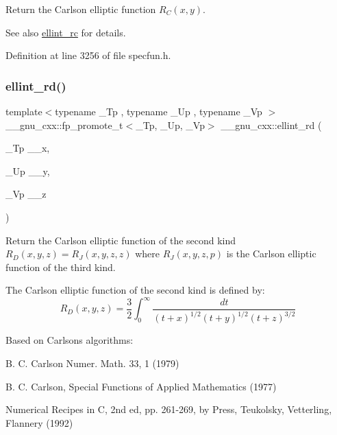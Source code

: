 Return the Carlson elliptic function $ R_C(x,y) $.

\begin{DoxySeeAlso}{See also}
\hyperlink{group__gnu__math__spec__func_ga7d3d42f5f71a74266be8aaca528056bf}{ellint\+\_\+rc} for details. 
\end{DoxySeeAlso}


Definition at line 3256 of file specfun.\+h.

\mbox{\label{group__gnu__math__spec__func_gad29dae6abc783c8fe952dba477e65309}} 
\subsubsection{\texorpdfstring{ellint\+\_\+rd()}{ellint\_rd()}}
{\footnotesize\ttfamily template$<$typename \+\_\+\+Tp , typename \+\_\+\+Up , typename \+\_\+\+Vp $>$ \\
\+\_\+\+\_\+gnu\+\_\+cxx\+::fp\+\_\+promote\+\_\+t$<$\+\_\+\+Tp, \+\_\+\+Up, \+\_\+\+Vp$>$ \+\_\+\+\_\+gnu\+\_\+cxx\+::ellint\+\_\+rd (\begin{DoxyParamCaption}\item[{\+\_\+\+Tp}]{\+\_\+\+\_\+x,  }\item[{\+\_\+\+Up}]{\+\_\+\+\_\+y,  }\item[{\+\_\+\+Vp}]{\+\_\+\+\_\+z }\end{DoxyParamCaption})\hspace{0.3cm}{\ttfamily [inline]}}

Return the Carlson elliptic function of the second kind $ R_D(x,y,z) = R_J(x,y,z,z) $ where $ R_J(x,y,z,p) $ is the Carlson elliptic function of the third kind.

The Carlson elliptic function of the second kind is defined by\+: \[ R_D(x,y,z) = \frac{3}{2} \int_0^\infty \frac{dt}{(t + x)^{1/2}(t + y)^{1/2}(t + z)^{3/2}} \]

Based on Carlson\textquotesingle{}s algorithms\+:
\begin{DoxyItemize}
\item B. C. Carlson Numer. Math. 33, 1 (1979)
\item B. C. Carlson, Special Functions of Applied Mathematics (1977)
\item Numerical Recipes in C, 2nd ed, pp. 261-\/269, by Press, Teukolsky, Vetterling, Flannery (1992)
\end{DoxyItemize}


